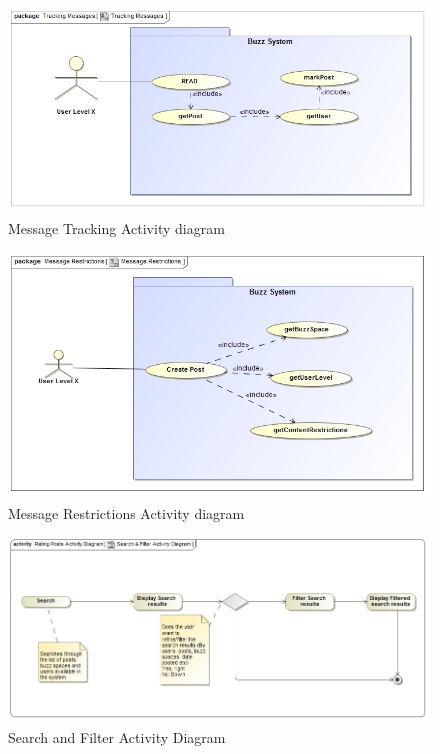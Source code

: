 \documentclass[11pt]{article}
\begin{document}
	\begin{figure}[H]	
    	\includegraphics[scale=0.5]{messageTracking.jpg}
    	\caption{Message Tracking Activity diagram}
	\end{figure}
	
	\begin{figure}[H]	
    	\includegraphics[scale=0.5]{messageRestrictions.jpg}
    	\caption{Message Restrictions Activity diagram}
	\end{figure}

					
	
	\graphicspath{ {../Diagrams/Sphe/Search&Filter/} }
	  \begin{figure}[H]	
    	\includegraphics[scale=0.65]{ActivityDiagram.jpg}
    	\caption{Search and Filter Activity Diagram}
	\end{figure}
	
\end{document}
